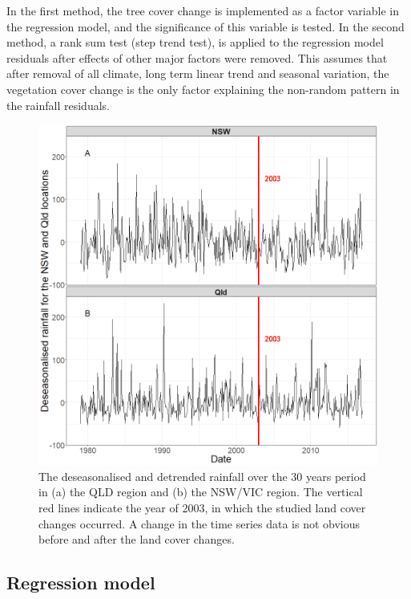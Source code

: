 \documentclass[fleqn,10pt,lineno]{wlpeerj} %
\theoremstyle{definition}
\theoremstyle{definition}
\theoremstyle{definition}
\theoremstyle{remark}
\begin{document}
In the first method, the tree cover change is implemented as a factor
variable in the regression model, and the significance of this variable
is tested. In the second method, a rank sum test (step trend test), is
applied to the regression model residuals after effects of other major
factors were removed. This assumes that after removal of all climate,
long term linear trend and seasonal variation, the vegetation cover
change is the only factor explaining the non-random pattern in the
rainfall residuals.

\begin{figure}
\includegraphics[width=0.9\linewidth]{figures/Fig4} \caption{The deseasonalised and detrended rainfall over the 30 years period in (a) the QLD region and (b) the NSW/VIC region. The vertical red lines indicate the year of 2003, in which the studied land cover changes occurred. A change in the time series data is not obvious before and after the land cover changes.}\label{fig:ts-mean}
\end{figure}

\subsection{Regression model}\label{reg_model}
\end{document}
